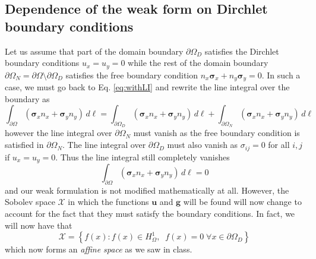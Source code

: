 \documentclass[11pt]{article}
\begin{document}
\subsection{Dependence of the weak form on Dirchlet boundary conditions}
Let us assume that part of the domain boundary $\partial\Omega_D$ satisfies the Dirchlet boundary conditions $u_x = u_y=0$ while the rest of the domain boundary $\partial\Omega_N = \partial\Omega \setminus \partial\Omega_D$ satisfies the free boundary condition $n_x\bm{\sigma}_x + n_y\bm{\sigma}_y = 0$. In such a case, we must go back to Eq. \eqref{eq:withLI} and rewrite the line integral over the boundary as
\begin{equation*}
\int_{\partial\Omega} \left( \bm{\sigma}_x n_x + \bm{\sigma}_y n_y \right) \, d\ell
=  \int_{\partial\Omega_D} \left( \bm{\sigma}_x n_x + \bm{\sigma}_y n_y \right) \, d\ell
+  \int_{\partial\Omega_N} \left( \bm{\sigma}_x n_x + \bm{\sigma}_y n_y \right) \, d\ell
\end{equation*}
however the line integral over $\partial\Omega_N$ must vanish as the free boundary condition is satisfied in $\partial\Omega_N$. The line integral over $\partial\Omega_D$ must also vanish as $\sigma_{ij} = 0$ for all $i,j$ if $u_x = u_y = 0$. Thus the line integral still completely vanishes
\begin{equation*}
\int_{\partial\Omega} \left( \bm{\sigma}_x n_x + \bm{\sigma}_y n_y \right) \, d\ell = 0
\end{equation*}
and our weak formulation is not modified mathematically at all. However, the Sobolev space $\mathcal{X}$ in which the functions $\bm{u}$ and $\bm{g}$ will be found will now change to account for the fact that they must satisfy the boundary conditions. In fact, we will now have that
\begin{equation}
\mathcal{X} = \left\{ f(x) : f(x) \in H^1_\Omega, \;\; f(x) = 0 \; \forall x \in \partial\Omega_D \right\}
\end{equation}
which now forms an \emph{affine space} as we saw in class.
\end{document}
